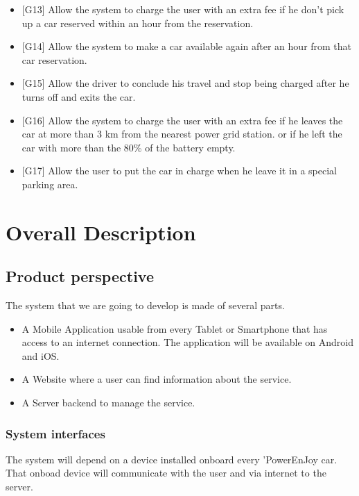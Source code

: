 \documentclass[english]{article}
\begin{document}
\begin{itemize}
	\item {[}G13{]} Allow the system to charge the user with an extra fee if he don't pick up a car reserved within an hour from the reservation.
	\item {[}G14{]} Allow the system to make a car available again after an hour from that car reservation.
	\item {[}G15{]} Allow the driver to conclude his travel and stop being charged after he turns off and exits the car.
	\item {[}G16{]} Allow the system to charge the user with an extra fee if he leaves the car at more than 3 km from the nearest power grid station. 
	or if he left the car with more than the 80\% of the battery empty.
	\item {[}G17{]} Allow the user to put the car in charge when he leave it in a special parking area.
\end{itemize}



\pagebreak{}



\section{Overall Description}



\subsection{Product perspective}
The system that we are going to develop is made of several parts. 
\begin{itemize}
	\item A Mobile Application usable from every Tablet or Smartphone that has access to an internet connection. The application will be available on Android and iOS. 
	\item A Website where a user can find information about the service.
	\item A Server backend to manage the service.
\end{itemize}

\subsubsection{System interfaces}
The system will depend on a device installed onboard every 'PowerEnJoy car. That onboad device will communicate with the user and via internet to the server.
\end{document}
